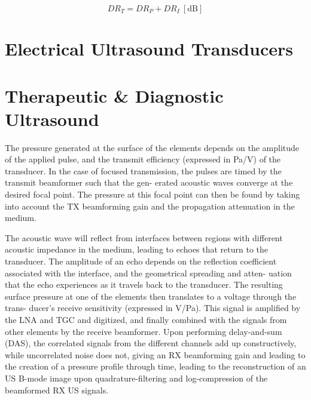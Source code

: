 \begin{equation}
  DR_T = DR_P + DR_I \ \mathrm{[dB]}
  \label{eq:ch2_propagation_dyn_range}
\end{equation}

\section{Electrical Ultrasound Transducers}
\label{sec:ultrasound_transducers}



\section{Therapeutic \& Diagnostic Ultrasound}
\label{sec:ultrasound_imaging}

The pressure generated at the surface of the elements depends on the amplitude of the applied pulse, and the transmit efficiency (expressed in Pa/V) of the transducer. In the case of focused transmission, the pulses are timed by the transmit beamformer such that the gen- erated acoustic waves converge at the desired focal point. The pressure at this focal point can then be found by taking into account the TX beamforming gain and the propagation attenuation in the medium. 

The acoustic wave will reflect from interfaces between regions with different acoustic impedance in the medium, leading to echoes that return to the transducer. The amplitude of an echo depends on the reflection coefficient associated with the interface, and the geometrical spreading and atten- uation that the echo experiences as it travels back to the transducer. The resulting surface pressure at one of the elements then translates to a voltage through the trans- ducer’s receive sensitivity (expressed in V/Pa). This signal is amplified by the LNA and TGC and digitized, and finally combined with the signals from other elements by the receive beamformer. Upon performing delay-and-sum (DAS), the correlated signals from the different channels add up constructively, while uncorrelated noise does not, giving an RX beamforming gain and leading to the creation of a pressure profile through time, leading to the reconstruction of an US B-mode image upon quadrature-filtering and log-compression of the beamformed RX US signals.



